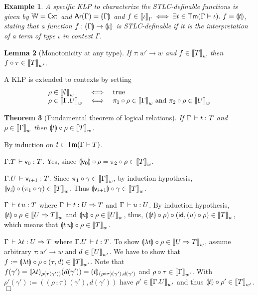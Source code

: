\documentclass[a4paper]{article}
\newtheorem{theorem}{Theorem}
\newtheorem{lemma}[theorem]{Lemma}
\newtheorem{example}[theorem]{Example}
\def\squareforqed{\ensuremath{\Box}}
\def\qed{\ifmmode\squareforqed\else{\unskip\nobreak\hfil
\penalty50\hskip1em\null\nobreak\hfil\squareforqed
\parfillskip=0pt\finalhyphendemerits=0\endgraf}\fi}
\newenvironment{proof*}[1][]{\noindent\ifthenelse{\equal{#1}{}}{{\it
      Proof.}}{{\it Proof #1.}}\hspace{2ex}}{\bigskip}
\newcommand{\WW}{\mathbb{W}}
\newcommand{\tAr}{\mathsf{Ar}}
\newcommand{\Ar}[1]{\tAr(#1)}
\begin{document}
\begin{example}
\label{ex:stlcdef}
A specific KLP to characterize the STLC-definable functions is given
by $\WW = \Cxt$ and $\Ar\Gamma = \denty\Gamma$ and
$f \in \Den\iota\Gamma \iff \exists t \in \Tm \Gamma \iota.\ f =
\denty t$, stating that a function $f : \denty\Gamma \to \denty\iota$
is STLC-definable if it is the interpretation of a term of type
$\iota$ in context $\Gamma$.
\end{example}
\begin{lemma}[Monotonicity at any type]
  If $\tau : w' \to w$ and $f \in \Den T w$ then $f \comp \tau \in
  \Den T {w'}$.
\end{lemma}
A KLP is extended to contexts by setting
\[
\begin{array}{lll}
  \rho \in \Den \cempty w & \iff & \mtrue \\
  \rho \in \Den {\Gamma.U} w & \iff &
    \pi_1 \comp \rho \in \Den \Gamma w \mand
    \pi_2 \comp \rho \in \Den U w
\end{array}
\]
\begin{theorem}[Fundamental theorem of logical relations]
  If\/ $\Gamma \der t : T$ and $\rho \in \Den \Gamma w$ then $\denty t \comp
  \rho \in \Den T w$.
\end{theorem}
\begin{proof*}
By induction on $t \in \Tm \Gamma T$.
\begin{caselist}

\nextcase $\Gamma.T \der \ind 0 : T$.  Yes, since $\denty{\ind 0}
\comp \rho = \pi_2 \comp \rho \in \Den T w$.

\nextcase $\Gamma.U \der \ind{i+1} : T$.
Since $\pi_1 \comp \gamma \in \Den \Gamma w$, by induction hypothesis,
$\denty{\ind i} \comp (\pi_1 \comp \gamma) \in \Den T w$.
Thus $\denty{\ind{i+1}} \comp \gamma \in \Den T w$.

\nextcase $\Gamma \der t\,u : T$ where $\Gamma \der t : U \To T$ and
$\Gamma \der u : U$.
By induction hypothesis, $\denty t \comp \rho \in \Den {U \To T} w$
and $\denty u \comp \rho \in \Den U w$, thus,
$(\denty t \comp \rho) \comp (\tid, \denty u \comp \rho) \in \Den T w$,
which means that $\denty{t\,u} \comp \rho \in \Den T w$.

\nextcase $\Gamma \der \lambda t : U \To T$ where $\Gamma.U \der t : T$.
To show $\denty{\lambda t} \comp \rho \in \Den {U \To T} w$, assume
arbitrary $\tau : w' \to w$ and $d \in \Den U {w'}$.  We have to show
that $f := \denty{\lambda t} \comp \rho \comp (\tau, d) \in \Den T
{w'}$.
Note that
$f(\gamma') = \dent{\lambda t}{\rho(\tau(\gamma'))}(d(\gamma'))
= \dent t{(\rho \comp \tau)(\gamma'),d(\gamma')}$
and $\rho \comp \tau \in \Den \Gamma {w'}$.
With $\rho'(\gamma') := ((\rho \comp \tau)(\gamma'), d(\gamma'))$
have $\rho' \in \Den{\Gamma.U}{w'}$ and thus $\denty t \comp \rho' \in
\Den T {w'}$.
\qed
\end{caselist}
\end{proof*}
\end{document}

